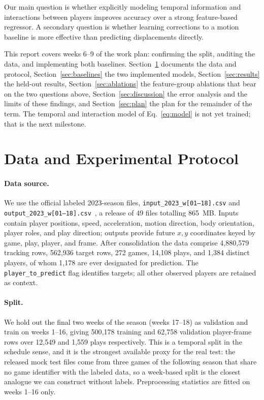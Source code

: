 \documentclass{article}
\begin{document}
Our main question is whether explicitly modeling temporal information and
interactions between players improves accuracy over a strong feature-based
regressor. A secondary question is whether learning corrections to a motion
baseline is more effective than predicting displacements directly.

This report covers weeks 6--9 of the work plan: confirming the split, auditing the
data, and implementing both baselines. Section~\ref{sec:data} documents the data and
protocol, Section~\ref{sec:baselines} the two implemented models,
Section~\ref{sec:results} the held-out results, Section~\ref{sec:ablations} the
feature-group ablations that bear on the two questions above,
Section~\ref{sec:discussion} the error analysis and the limits of these findings, and
Section~\ref{sec:plan} the plan for the remainder of the term. The temporal and
interaction model of Eq.~\eqref{eq:model} is not yet trained; that is the next
milestone.

\section{Data and Experimental Protocol}
\label{sec:data}

\paragraph{Data source.}
We use the official labeled 2023-season files,
\texttt{input\_2023\_w[01--18].csv} and \texttt{output\_2023\_w[01--18].csv}~\cite{data},
a release of 49 files totalling 865~MB. Inputs contain player positions, speed,
acceleration, motion direction, body orientation, player roles, and play direction;
outputs provide future $x,y$ coordinates keyed by game, play, player, and frame.
After consolidation the data comprise 4{,}880{,}579 tracking rows, 562{,}936 target
rows, 272 games, 14{,}108 plays, and 1{,}384 distinct players, of whom 1{,}178 are
ever designated for prediction. The \texttt{player\_to\_predict} flag identifies
targets; all other observed players are retained as context.

\paragraph{Split.}
We hold out the final two weeks of the season (weeks 17--18) as validation and train
on weeks 1--16, giving 500{,}178 training and 62{,}758 validation player-frame rows
over 12{,}549 and 1{,}559 plays respectively. This is a temporal split in the
schedule sense, and it is the strongest available proxy for the real test: the
released mock test files come from three games of the following season that share no
game identifier with the labeled data, so a week-based split is the closest analogue
we can construct without labels. Preprocessing statistics are fitted on weeks 1--16
only.
\end{document}
